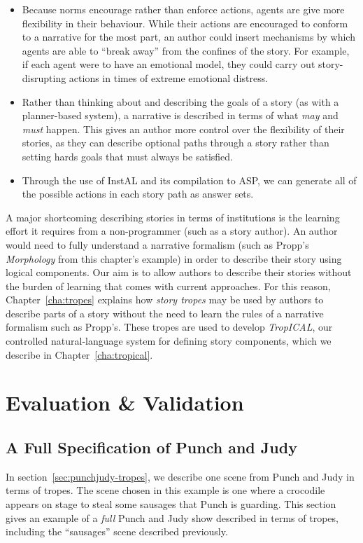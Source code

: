 \documentclass[11pt]{report}
\newcommand{\added}[2]{%
  \todo[noline,bordercolor=white,color=green,size=\scriptsize]{#2}
  \cbcolor{green}
  \begin{changebar}
    #1
  \end{changebar}%
  }%
\newcommand{\added}[2]{#1}
\begin{document}
\begin{itemize}
  \item Because norms encourage rather than enforce actions, agents are give
    more flexibility in their behaviour. While their actions are encouraged to
    conform to a narrative for the most part, an author could insert mechanisms
    by which agents are able to ``break away'' from the confines of the story.
    For example, if each agent were to have an emotional model, they could carry
    out story-disrupting actions in times of extreme emotional distress.
  \item Rather than thinking about and describing the goals of a story (as with
    a planner-based system), a narrative is described in terms of what
    \emph{may} and \emph{must} happen. This gives an author more control over
    the flexibility of their stories, as they can describe optional paths
    through a story rather than setting hards goals that must always be
    satisfied.
  \item Through the use of InstAL and its compilation to ASP, we can generate
    all of the possible actions in each story path as answer sets.
\end{itemize}

A major shortcoming describing stories in terms of
institutions is the learning effort it requires from a non-programmer (such as a
story author). An author would need to fully understand a narrative formalism (such as Propp's \emph{Morphology} from this chapter's
example) in order to describe their story using logical components. Our aim is
to allow authors to describe their stories without the burden of learning that
comes with current approaches. For this reason, Chapter~\ref{cha:tropes} explains how
\emph{story tropes} may be used by authors to describe parts of a story
without the need to learn the rules of a narrative formalism such as Propp's.
These tropes are used to develop \emph{TropICAL}, our controlled
natural-language system for defining story components, which we describe in Chapter~\ref{cha:tropical}.

\chapter{Evaluation \& Validation}
\label{cha:evaluation}
\added{

}{New chapter for Evaluation and Validation}
\section{A Full Specification of Punch and Judy}
\label{sec:pj-fullspec}
In section~\ref{sec:punchjudy-tropes}, we describe one scene from Punch and Judy
in terms of tropes. The scene chosen in this example is one where a crocodile
appears on stage to steal some sausages that Punch is guarding. This section
gives an example of a \emph{full} Punch and Judy show described in terms of
tropes, including the ``sausages'' scene described previously.
\end{document}

